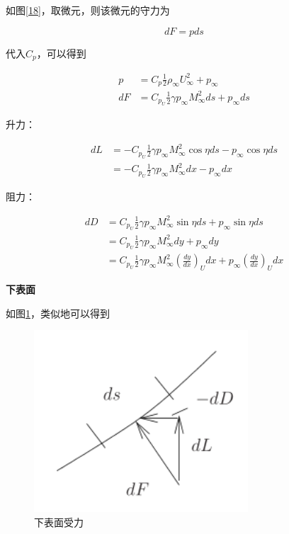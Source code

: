 如图\ref{18}，取微元，则该微元的守力为

\begin{equation*}
    d F=p d s
\end{equation*}

代入$C_p$，可以得到

\begin{align*}
    p&=C_{p} \frac{1}{2} \rho_{\infty} U_{\infty}^{2}+p_{\infty}\\ 
    d F&=C_{p_{U}} \frac{1}{2} \gamma p_{\infty} M_{\infty}^{2} d s+p_{\infty} d s
\end{align*}

升力：

\begin{align*}
    d L&=-C_{p_{U}} \frac{1}{2} \gamma p_{\infty} M_{\infty}^{2} \cos \eta d s-p_{\infty} \cos \eta d s\\ 
    &=-C_{p_{U}} \frac{1}{2} \gamma p_{\infty} M_{\infty}^{2} d x-p_{\infty} d x
\end{align*}

阻力：

\begin{align*}
    d D&=C_{p_{U}} \frac{1}{2} \gamma p_{\infty} M_{\infty}^{2} \sin \eta d s+p_{\infty} \sin \eta d s\\ 
    &=C_{p_{U}} \frac{1}{2} \gamma p_{\infty} M_{\infty}^{2} d y+p_{\infty} d y\\ 
    &=C_{p_{U}} \frac{1}{2} \gamma p_{\infty} M_{\infty}^{2}\left(\frac{d y}{d x}\right)_{U} d x+p_{\infty}\left(\frac{d y}{d x}\right)_{U} d x
\end{align*}

\textbf{下表面}

如图\ref{19}，类似地可以得到

\begin{figure}[!ht]
    \centering
    \includegraphics[width=8cm]{figures/19.png}
    \caption{下表面受力}
    \label{19}
\end{figure}

